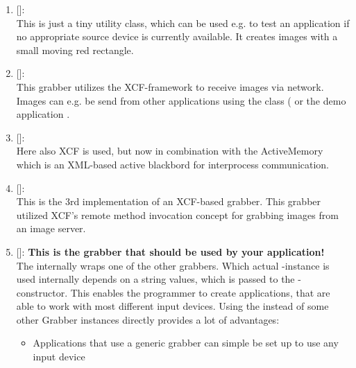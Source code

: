 \begin{enumerate}
The SwissRanger is a so-called time-of-flight camera from the Mesa-Imaging company\footnote{}. It uses a set of pulsed IR-LED's to compute depth images. This grabber uses the libmesasr-library for accessing camera features and image data. The SwissRanger camera also provides gray-scale images and a confidence map, which tells the user the estimated accuracy for each depth-pixel.
\item {} []:\\
This is just a tiny utility class, which can be used e.g. to test an application if no appropriate source device is currently available. It creates images with a small moving red rectangle.
\item {} []:\\
This grabber utilizes the XCF-framework to receive images via network. Images can e.g. be send from other applications using the  class ( or the demo application .
\item {} []:\\
Here also XCF is used, but now in combination with the ActiveMemory which is an XML-based active blackbord for interprocess communication. 
\item {} []:\\
This is the 3rd implementation of an XCF-based grabber. This grabber utilized XCF's remote method invocation concept for grabbing images from an image server.
\item {} []: \textbf{This is the grabber that should be used by your application!}\\
The  internally wraps one of the other grabbers. Which actual -instance is used internally depends on a string values, which is passed to the -constructor. This enables the programmer to create applications, that are able to work with most different input devices. Using the  instead of some other Grabber instances directly provides a lot of advantages:
\begin{itemize}
\item Applications that use a generic grabber can simple be set up to use any input device

\end{itemize}
\end{enumerate}
